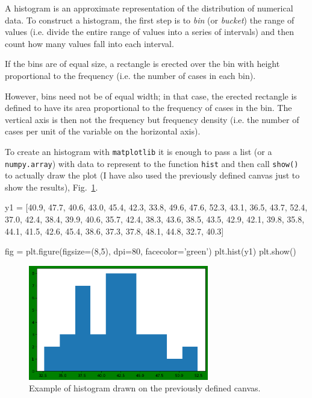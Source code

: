 \begin{ipython}
A histogram is an approximate representation of the distribution of numerical data. To construct a histogram, the first step is to \emph{bin} (or \emph{bucket}) the range of values (i.e. divide the entire range of values into a series of intervals) and then count how many values fall into each interval.

If the bins are of equal size, a rectangle is erected over the bin with height proportional to the frequency (i.e. the number of cases in each bin).

However, bins need not be of equal width; in that case, the erected rectangle is defined to have its area proportional to the frequency of cases in the bin. The vertical axis is then not the frequency but frequency density (i.e. the number of cases per unit of the variable on the horizontal axis).

To create an histogram with \texttt{matplotlib} it is enough to pass a list (or a \texttt{numpy.array}) with data to represent to the function \texttt{hist} and then call \texttt{show()} to actually draw the plot (I have also used the previously defined canvas just to show the results), Fig.~\ref{fig:histo1}.

\begin{ipython}
y1 = [40.9, 47.7, 40.6, 43.0, 45.4, 42.3, 33.8, 49.6,
47.6, 52.3, 43.1, 36.5, 43.7, 52.4, 37.0, 42.4, 38.4, 39.9, 40.6, 35.7, 42.4,
38.3, 43.6, 38.5, 43.5, 42.9, 42.1, 39.8, 35.8, 44.1,
41.5, 42.6, 45.4, 38.6, 37.3, 37.8, 48.1, 44.8, 32.7, 40.3]

fig = plt.figure(figsize=(8,5), dpi=80, facecolor='green')
plt.hist(y1)
plt.show()
\end{ipython}

\begin{figure}[htb]
	\centering
	\includegraphics[width=0.7\textwidth]{figures/histo1}
	\caption{Example of histogram drawn on the previously defined canvas.}
	\label{fig:histo1}
\end{figure}


\end{ipython}
